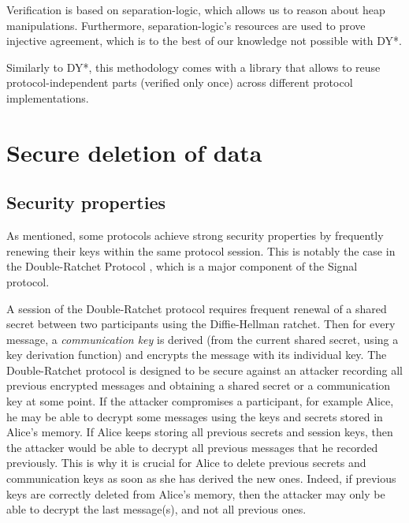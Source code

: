 \documentclass{article}
\begin{document}
Verification is based on separation-logic, which allows us to reason about heap manipulations. Furthermore, separation-logic's resources are used to prove injective agreement, which is to the best of our knowledge not possible with DY*.

Similarly to DY*, this methodology comes with a library that allows to reuse protocol-independent parts (verified only once) across different protocol implementations.

\section{Secure deletion of data}

\subsection{Security properties}

As mentioned, some protocols achieve strong security properties by frequently renewing their keys within the same protocol session. This is notably the case in the Double-Ratchet Protocol \cite{perrin2016double}, which is a major component of the Signal protocol.

A session of the Double-Ratchet protocol requires frequent renewal of a shared secret between two participants using the Diffie-Hellman ratchet.
Then for every message, a \emph{communication key} is derived (from the current shared secret, using a key derivation function) and encrypts the message with its individual key.
The Double-Ratchet protocol is designed to be secure against an attacker recording all previous encrypted messages and obtaining a shared secret or a communication key at some point.
If the attacker compromises a participant, for example Alice, he may be able to decrypt some messages using the keys and secrets stored in Alice's memory. If Alice keeps storing all previous secrets and session keys, then the attacker would be able to decrypt all previous messages that he recorded previously. This is why it is crucial for Alice to delete previous secrets and communication keys as soon as she has derived the new ones.
Indeed, if previous keys are correctly deleted from Alice's memory, then the attacker may only be able to decrypt the last message(s), and not all previous ones.
\end{document}
